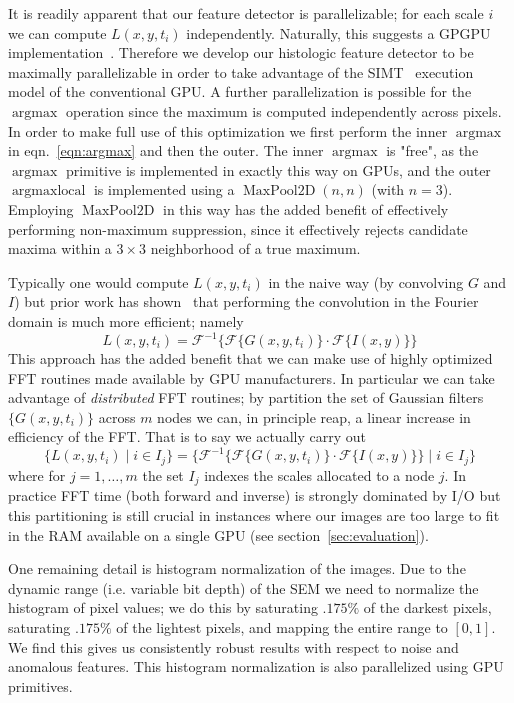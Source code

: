\documentclass[sigconf,nonacm]{acmart}
\begin{document}
It is readily apparent that our feature detector is parallelizable; for each scale $i$ we can compute $L(x,y,t_i)$ independently.
Naturally, this suggests a GPGPU implementation~\cite{}.
Therefore we develop our histologic feature detector to be maximally parallelizable in order to take advantage of the SIMT~\cite{} execution model of the conventional GPU.
A further parallelization is possible for the $\operatorname*{argmax}$ operation since the maximum is computed independently across pixels.
In order to make full use of this optimization we first perform the inner $\operatorname*{argmax}$ in eqn.~\ref{eqn:argmax} and then the outer.
The inner $\operatorname*{argmax}$ is "free", as the $\operatorname*{argmax}$ primitive is implemented in exactly this way on GPUs, and the outer $\operatorname*{argmaxlocal}$ is implemented using a $\operatorname{MaxPool2D}(n,n)$ (with $n=3$).
Employing $\operatorname{MaxPool2D}$ in this way has the added benefit of effectively performing non-maximum suppression, since it effectively rejects candidate maxima within a $3 \times 3$ neighborhood of a true maximum.

Typically one would compute  $L(x,y,t_{i})$ in the naive way (by convolving $G$ and $I$) but prior work has shown~\cite{citemerfpaper} that performing the convolution in the Fourier domain is much more efficient; namely
$$
    L(x,y,t_i) = \mathcal{F}^{-1} \big\{\mathcal{F}\{G(x,y,t_i)\} \cdot \mathcal{F}\{I(x,y)\} \big\}
$$
This approach has the added benefit that we can make use of highly optimized FFT routines made available by GPU manufacturers.
In particular we can take advantage of \textit{distributed} FFT routines; by partition the set of Gaussian filters $\{ G(x,y,t_i) \}$ across $m$ nodes we can, in principle reap, a linear increase in efficiency of the FFT.
That is to say we actually carry out
$$
    \{ L(x,y,t_i) \mid i \in I_j \} = \big\{ \mathcal{F}^{-1} \{\mathcal{F}\{G(x,y,t_i)\} \cdot \mathcal{F}\{I(x,y)\} \} \mid i \in I_j \big\}
$$
where for $j = 1, \dots, m$ the set $I_j$ indexes the scales allocated to a node $j$.
In practice FFT time (both forward and inverse) is strongly dominated by I/O but this partitioning is still crucial in instances where our images are too large to fit in the RAM available on a single GPU (see section~\ref{sec:evaluation}).

One remaining detail is histogram normalization of the images.
Due to the dynamic range (i.e. variable bit depth) of the SEM we need to normalize the histogram of pixel values; we do this by saturating $.175\%$ of the darkest pixels, saturating $.175\%$ of the lightest pixels, and mapping the entire range to $[0,1]$.
We find this gives us consistently robust results with respect to noise and anomalous features.
This histogram normalization is also parallelized using GPU primitives.
\end{document}
